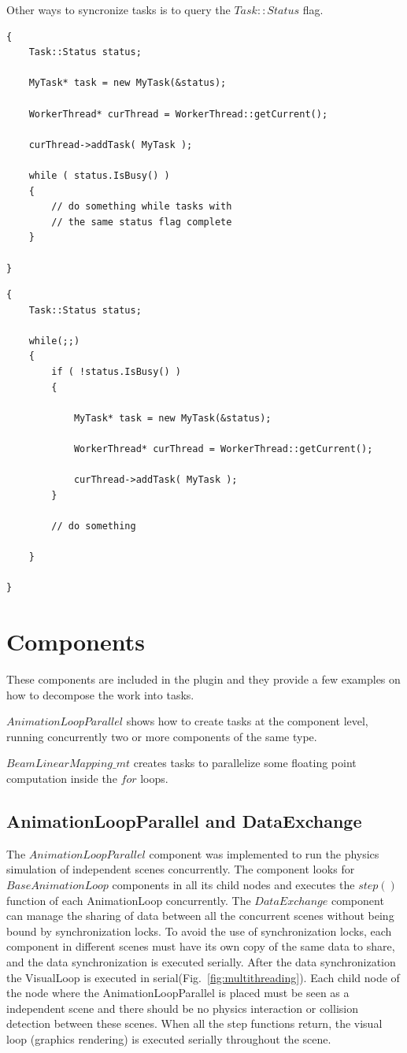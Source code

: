 \documentclass{article}
\begin{document}
Other ways to syncronize tasks is to query the $Task::Status$ flag.


\begin{lstlisting}
{
	Task::Status status;

	MyTask* task = new MyTask(&status);

	WorkerThread* curThread = WorkerThread::getCurrent();

	curThread->addTask( MyTask );

	while ( status.IsBusy() )
	{
		// do something while tasks with 
		// the same status flag complete
	}

}
\end{lstlisting}

\begin{lstlisting}
{
	Task::Status status;

	while(;;)
	{
		if ( !status.IsBusy() )
		{
		
			MyTask* task = new MyTask(&status);

			WorkerThread* curThread = WorkerThread::getCurrent();

			curThread->addTask( MyTask );
		}
		
		// do something
		
	}

}
\end{lstlisting}


\section{Components}

These components are included in the plugin and they provide a few examples on how to decompose the work into tasks.

$AnimationLoopParallel$ shows how to create tasks at the component level, running concurrently two or more components of the same type.

$BeamLinearMapping\_mt$ creates tasks to parallelize some floating point computation inside the $for$ loops.

\subsection{AnimationLoopParallel and DataExchange}

The $AnimationLoopParallel$ component was implemented to run the physics simulation of independent scenes concurrently.
The component looks for $BaseAnimationLoop$ components in all its child nodes and executes the $step()$ function of each AnimationLoop concurrently.
The $DataExchange$ component can manage the sharing of data between all the concurrent scenes without being bound by synchronization locks. To avoid the use of synchronization locks, each component in different scenes must have its own copy of the same data to share, and the data synchronization is executed serially.
After the data synchronization the VisualLoop is executed in serial(Fig.~\ref{fig:multithreading}).
Each child node of the node where the AnimationLoopParallel is placed must be seen as a independent scene and there should be no physics interaction or collision detection between these scenes.
When all the step functions return, the visual loop (graphics rendering) is executed serially throughout the scene.
\end{document}
